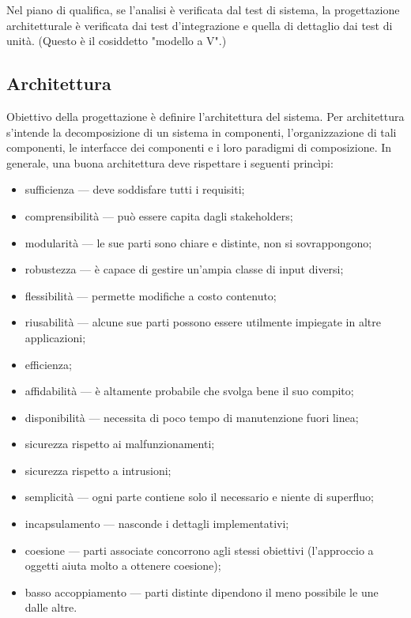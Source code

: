 \documentclass[a4paper]{article}
\begin{document}
		
Nel piano di qualifica, se l'analisi è verificata dal test di sistema, la progettazione architetturale è verificata dai test d'integrazione e quella di dettaglio dai test di unità. (Questo è il cosiddetto "modello a V".)

		
	\subsection{Architettura}

		
Obiettivo della progettazione è definire l'architettura del sistema. Per architettura s'intende la decomposizione di un sistema in componenti, l'organizzazione di tali componenti, le interfacce dei componenti e i loro paradigmi di composizione. In generale, una buona architettura deve rispettare i seguenti princìpi:
		
	\begin{itemize}
		
			
	\item sufficienza --- deve soddisfare tutti i requisiti;
			
	\item comprensibilità --- può essere capita dagli stakeholders;
			
	\item modularità --- le sue parti sono chiare e distinte, non si sovrappongono;
			
	\item robustezza --- è capace di gestire un'ampia classe di input diversi;
			
	\item flessibilità --- permette modifiche a costo contenuto;
			
	\item riusabilità --- alcune sue parti possono essere utilmente impiegate in altre applicazioni;
			
	\item efficienza;
			
	\item affidabilità --- è altamente probabile che svolga bene il suo compito;
			
	\item disponibilità --- necessita di poco tempo di manutenzione fuori linea;
			
	\item sicurezza rispetto ai malfunzionamenti;
			
	\item sicurezza rispetto a intrusioni;
			
	\item semplicità --- ogni parte contiene solo il necessario e niente di superfluo;
			
	\item incapsulamento --- nasconde i dettagli implementativi;
			
	\item coesione --- parti associate concorrono agli stessi obiettivi (l'approccio a oggetti aiuta molto a ottenere coesione);
			
	\item basso accoppiamento --- parti distinte dipendono il meno possibile le une dalle altre.
		
	\end{itemize}
\end{document}

